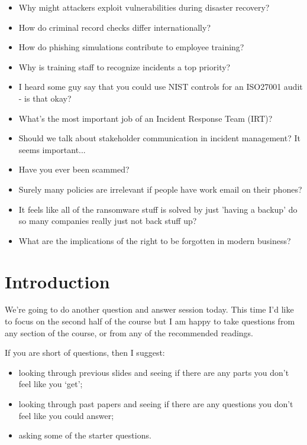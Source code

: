 \documentclass[12pt]{article}
\begin{document}
\begin{itemize}
  \item Why might attackers exploit vulnerabilities during disaster recovery?
  \item How do criminal record checks differ internationally?
  \item How do phishing simulations contribute to employee training?
  \item Why is training staff to recognize incidents a top priority?
  \item I heard some guy say that you could use NIST controls for an ISO27001 audit - is that okay?
  \item What's the most important job of an Incident Response Team (IRT)?
  \item Should we talk about stakeholder communication in incident management? It seems important...
  \item Have you ever been scammed?
  \item Surely many policies are irrelevant if people have work email on their phones?
  \item It feels like all of the ransomware stuff is solved by just 'having a backup' do so many companies really just not back stuff up?
  \item What are the implications of the right to be forgotten in modern business?
\end{itemize}


%
%



\maketitle

\section*{Introduction}
We're going to do another question and answer session today. This time I'd like to focus on the second half of the course but I am happy to take questions from any section of the course, or from any of the recommended readings. 

If you are short of questions, then I suggest: 

\begin{itemize} 
\item looking through previous slides and seeing if there are any parts you don't feel like you `get';
\item looking through past papers and seeing if there are any questions you don't feel like you could answer;
\item asking some of the starter questions.
\end{itemize} 
\end{document}
